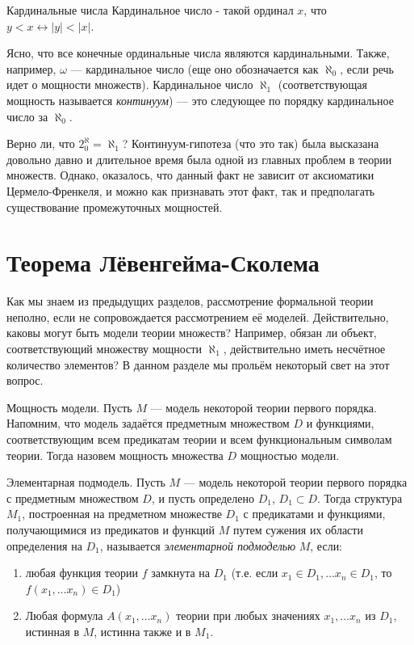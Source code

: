 \begin{definition}{Кардинальные числа}
Кардинальное число - такой ординал $x$, что $y < x \leftrightarrow |y| < |x|$.
\end{definition}

Ясно, что все конечные ординальные числа являются кардинальными. 
Также, например, $\omega$ --- кардинальное число 
(еще оно обозначается как $\aleph_0$, если речь идет о мощности множеств).
Кардинальное число $\aleph_1$ (соответствующая мощность называется \emph{континуум}) ---
это следующее по порядку кардинальное число за $\aleph_0$.

Верно ли, что $2^\aleph_0 = \aleph_1$?
Континуум-гипотеза (что это так) была высказана
довольно давно и длительное время была одной из главных проблем в теории множеств.
Однако, оказалось, что данный факт не зависит от аксиоматики Цермело-Френкеля, и можно
как признавать этот факт, так и предполагать существование промежуточных мощностей.

\section{Теорема Лёвенгейма-Сколема}

Как мы знаем из предыдущих разделов, рассмотрение формальной теории неполно, 
если не сопровождается рассмотрением её моделей. Действительно, каковы могут
быть модели теории множеств? Например, обязан ли объект, соответствующий
множеству мощности $\aleph_1$, действительно иметь несчётное количество
элементов? В данном разделе мы прольём некоторый свет на этот вопрос.

\begin{definition}{Мощность модели.}
Пусть $M$ --- модель некоторой теории первого порядка. Напомним, что модель
задаётся предметным множеством $D$ и функциями, соответствующим всем
предикатам теории и всем функциональным символам теории. Тогда назовем
мощность множества $D$ мощностью модели.
\end{definition}

\begin{definition}{Элементарная подмодель.}
Пусть $M$ --- модель некоторой теории первого порядка с предметным
множеством $D$, и пусть определено $D_1$, $D_1 \subset D$. Тогда
структура $M_1$, построенная на предметном множестве $D_1$ с предикатами
и функциями, получающимися из предикатов и функций $M$ путем сужения 
их области определения на $D_1$, называется \emph{элементарной подмоделью} $M$,
если:
\begin{enumerate}
\item любая функция теории $f$ замкнута на $D_1$ 
(т.е. если $x_1 \in D_1, \dots x_n \in D_1$, то
$f(x_1, \dots x_n) \in D_1$)
\item Любая формула $A(x_1, \dots x_n)$ теории при любых значениях
$x_1, \dots x_n$ из $D_1$, истинная в $M$, истинна также и в $M_1$.
\end{enumerate}
\end{definition}

